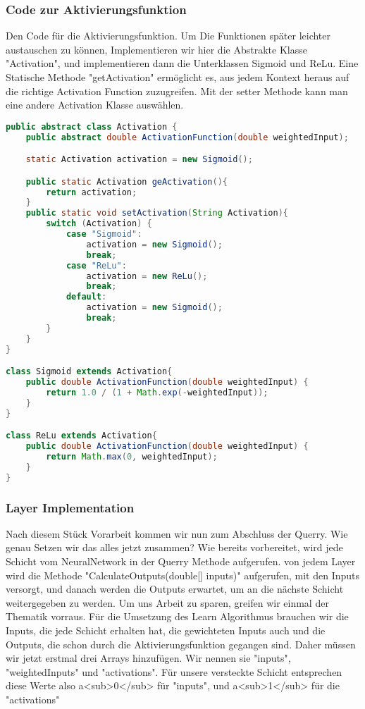 \documentclass[12pt]{article}
\begin{document}
\subsubsection{Code zur Aktivierungsfunktion}
Den Code für die Aktivierungsfunktion. Um Die Funktionen später leichter austauschen zu können, Implementieren wir hier die Abstrakte Klasse "Activation", und implementieren dann die Unterklassen Sigmoid und ReLu. Eine Statische Methode "getActivation" ermöglicht es, aus jedem Kontext heraus auf die richtige Activation Function zuzugreifen. Mit der setter Methode kann man eine andere Activation Klasse auswählen.
\begin{lstlisting}[language=Java]
public abstract class Activation {
    public abstract double ActivationFunction(double weightedInput);

    static Activation activation = new Sigmoid();

    public static Activation geActivation(){
        return activation;
    }
    public static void setActivation(String Activation){
        switch (Activation) {
            case "Sigmoid":
                activation = new Sigmoid();
                break;
            case "ReLu":
                activation = new ReLu();
                break;
            default:
                activation = new Sigmoid();
                break;
        }
    }
}

class Sigmoid extends Activation{
    public double ActivationFunction(double weightedInput) {
        return 1.0 / (1 + Math.exp(-weightedInput));
    }
}

class ReLu extends Activation{
    public double ActivationFunction(double weightedInput) {
        return Math.max(0, weightedInput);
    }
}
\end{lstlisting}

\subsubsection{Layer Implementation}
Nach diesem Stück Vorarbeit kommen wir nun zum Abschluss der Querry. Wie genau Setzen wir das alles jetzt zusammen?
Wie bereits vorbereitet, wird jede Schicht vom NeuralNetwork in der Querry Methode aufgerufen. von jedem Layer wird die Methode "CalculateOutputs(double[] inputs)" aufgerufen, mit den Inputs versorgt, und danach werden die Outputs erwartet, um an die nächste Schicht weitergegeben zu werden.
Um uns Arbeit zu sparen, greifen wir einmal der Thematik vorraus. Für die Umsetzung des Learn Algorithmus brauchen wir die Inputs, die jede Schicht erhalten hat, die gewichteten Inputs auch und die Outputs, die schon durch die Aktivierungsfunktion gegangen sind. Daher müssen wir jetzt erstmal drei Arrays hinzufügen. Wir nennen sie "inputs", "weightedInputs" und "activations". Für unsere versteckte Schicht entsprechen diese Werte also a<sub>0</sub> für "inputs", und a<sub>1</sub> für die "activations"
\end{document}
